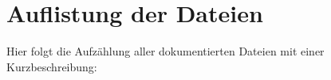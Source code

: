 \section{Auflistung der Dateien}
Hier folgt die Aufzählung aller dokumentierten Dateien mit einer Kurzbeschreibung:\begin{DoxyCompactList}
\item{}
\end{DoxyCompactList}
